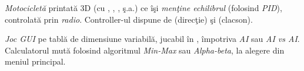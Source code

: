 {
\emph{Motociclet\u{a}} printat\u{a} 3D (cu , , , \c{s}.a.) ce \^{i}\c{s}i \emph{men\c{t}ine echilibrul} (folosind \emph{PID}), controlat\u{a} prin \emph{radio}. Controller-ul dispune de  (direc\c{t}ie) \c{s}i  (clacson).
}

{
\emph{Joc GUI} pe tabl\u{a} de dimensiune variabil\u{a}, jucabil \^{i}n , \^{i}mpotriva \emph{AI} sau \emph{AI vs AI}. Calculatorul mut\u{a} folosind algoritmul \emph{Min-Max} sau \emph{Alpha-beta}, la alegere din meniul principal.
}

